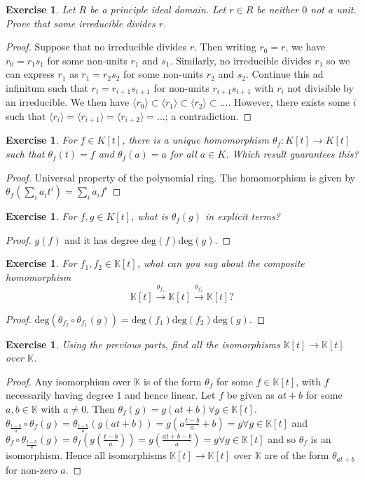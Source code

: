 \documentclass{article}
\newtheorem{exercise}[theorem]{Exercise}
\begin{document}
\begin{exercise}
Let $R$ be a principle ideal domain. Let $r\in R$ be neither $0$ not a unit. Prove that some irreducible divides $r$.
\end{exercise}
\begin{proof}
Suppose that no irreducible divides $r$. Then writing $r_0=r$, we have $r_0=r_1s_1$ for some non-units $r_1$ and $s_1$. Similarly, no irreducible divides $r_1$ so we can express $r_1$ as $r_1=r_2s_2$ for some non-units $r_2$ and $s_2$. Continue this ad infinitum such that $r_i=r_{i+1}s_{i+1}$ for non-units $r_{i+1}s_{i+1}$ with $r_i$ not divisible by an irreducible. We then have $\langle r_0\rangle\subset\langle r_1\rangle\subset\langle r_2\rangle\subset...$. However, there exists some $i$ such that $\langle r_i\rangle=\langle r_{i+1}\rangle=\langle r_{i+2}\rangle=...$; a contradiction.
\end{proof}

\begin{exercise}
For $f\in K[t]$, there is a unique homomorphism $\theta_f\colon K[t]\to K[t]$ such that $\theta_f(t)=f$ and $\theta_f(a)=a$ for all $a\in K$. Which result guarantees this?
\end{exercise}
\begin{proof}
Universal property of the polynomial ring. The homomorphism is given by $\theta_f(\sum_i a_it^i)=\sum_i a_if^i$
\end{proof}
\begin{exercise}
For $f,g\in K[t]$, what is $\theta_f(g)$ in explicit terms?
\end{exercise}
\begin{proof}
$g(f)$ and it has degree $\text{deg}(f)\text{deg}(g)$.
\end{proof}

\begin{exercise}
For $f_1,f_2\in\mathbb{K}[t]$, what can you say about the composite homomorphism\[\mathbb{K}[t]\overset{\theta_{f_1}}{\to}\mathbb{K}[t]\overset{\theta_{f_2}}{\to}\mathbb{K}[t]?\]
\end{exercise}
\begin{proof}
$\text{deg}(\theta_{f_2}\circ\theta_{f_1}(g))=\text{deg}(f_1)\text{deg}(f_2)\text{deg}(g)$.
\end{proof}
\begin{exercise}
Using the previous parts, find all the isomorphisms $\mathbb{K}[t]\to\mathbb{K}[t]$ over $\mathbb{K}$.
\end{exercise}
\begin{proof}
Any isomorphism over $\mathbb{K}$ is of the form $\theta_f$ for some $f\in\mathbb{K}[t]$, with $f$ necessarily having degree $1$ and hence linear. Let $f$ be given as $at+b$ for some $a,b\in\mathbb{K}$ with $a\neq0$. Then $\theta_f(g)=g(at+b)\forall g\in\mathbb{K}[t]$. $\theta_{\frac{t-b}{a}}\circ\theta_{f}(g)=\theta_{\frac{t-b}{a}}(g(at+b))=g(a\frac{t-b}{a}+b)=g\forall g\in \mathbb{K}[t]$ and $\theta_f\circ\theta_{\frac{t-b}{a}}(g)=\theta_f(g(\frac{t-b}{a}))=g(\frac{at+b-b}{a})=g\forall g\in\mathbb{K}[t]$ and so $\theta_f$ is an isomorphism. Hence all isomorphisms $\mathbb{K}[t]\to\mathbb{K}[t]$ over $\mathbb{K}$ are of the form $\theta_{at+b}$ for non-zero $a$.
\end{proof}
\end{document}
